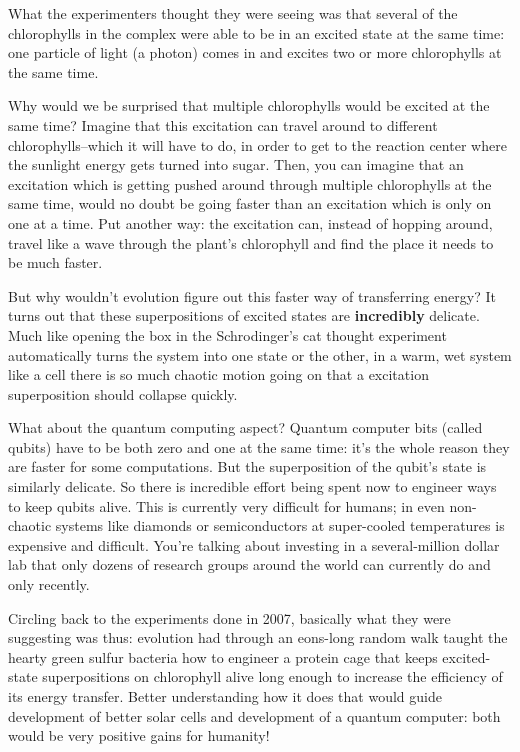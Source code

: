 What the experimenters thought they were seeing was that several of the chlorophylls in the complex were able to be in an excited state at the same time: one particle of light (a photon) comes in and excites two or more chlorophylls at the same time.

Why would we be surprised that multiple chlorophylls would be excited at the same time?  Imagine that this excitation can travel around to different chlorophylls--which it will have to do, in order to get to the reaction center where the sunlight energy gets turned into sugar.  Then, you can imagine that an excitation which is getting pushed around through multiple chlorophylls at the same time, would no doubt be going faster than an excitation which is only on one at a time.  Put another way: the excitation can, instead of hopping around, travel like a wave through the plant's chlorophyll and find the place it needs to be much faster.

But why wouldn't evolution figure out this faster way of transferring energy?  It turns out that these superpositions of excited states are \textbf{incredibly} delicate.  Much like opening the box in the Schrodinger's cat thought experiment automatically turns the system into one state or the other, in a warm, wet system like a cell there is so much chaotic motion going on that a excitation superposition should collapse quickly.

What about the quantum computing aspect?  Quantum computer bits (called qubits) have to be both zero and one at the same time: it's the whole reason they are faster for some computations.  But the superposition of the qubit's state is similarly delicate.  So there is incredible effort being spent now to engineer ways to keep qubits alive.  This is currently very difficult for humans; in even non-chaotic systems like diamonds or semiconductors at super-cooled temperatures is expensive and difficult.  You're talking about investing in a several-million dollar lab that only dozens of research groups around the world can currently do and only recently.

Circling back to the experiments done in 2007, basically what they were suggesting was thus: evolution had through an eons-long random walk taught the hearty green sulfur bacteria how to engineer a protein cage that keeps excited-state superpositions on chlorophyll alive long enough to increase the efficiency of its energy transfer.  Better understanding how it does that would guide  development of better solar cells and development of a quantum computer: both would be very positive gains for humanity!

